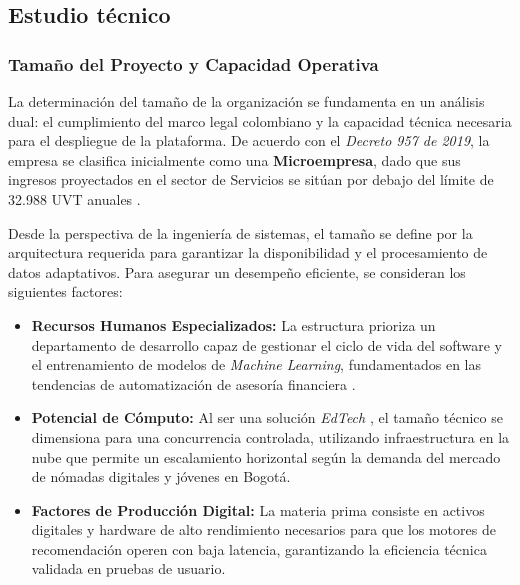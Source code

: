 \subsection*{Estudio técnico}

\subsubsection*{Tamaño del Proyecto y Capacidad Operativa}

La determinación del tamaño de la organización se fundamenta en un análisis dual: el cumplimiento del marco legal colombiano y la capacidad técnica necesaria para el despliegue de la plataforma. De acuerdo con el \textit{Decreto 957 de 2019}, la empresa se clasifica inicialmente como una \textbf{Microempresa}, dado que sus ingresos proyectados en el sector de Servicios se sitúan por debajo del límite de 32.988 UVT anuales \parencite{Decreto1297}.

Desde la perspectiva de la ingeniería de sistemas, el tamaño se define por la arquitectura requerida para garantizar la disponibilidad y el procesamiento de datos adaptativos. Para asegurar un desempeño eficiente, se consideran los siguientes factores:

\begin{itemize}
	\item \textbf{Recursos Humanos Especializados:} La estructura prioriza un departamento de desarrollo capaz de gestionar el ciclo de vida del software y el entrenamiento de modelos de \textit{Machine Learning}, fundamentados en las tendencias de automatización de asesoría financiera \parencite{BBVAResearch01}.
	
	\item \textbf{Potencial de Cómputo:} Al ser una solución \textit{EdTech} \parencite{UniversidadEuropea01}, el tamaño técnico se dimensiona para una concurrencia controlada, utilizando infraestructura en la nube que permite un escalamiento horizontal según la demanda del mercado de nómadas digitales y jóvenes en Bogotá.
	
	\item \textbf{Factores de Producción Digital:} La materia prima consiste en activos digitales y hardware de alto rendimiento necesarios para que los motores de recomendación operen con baja latencia, garantizando la eficiencia técnica validada en pruebas de usuario.
\end{itemize}

